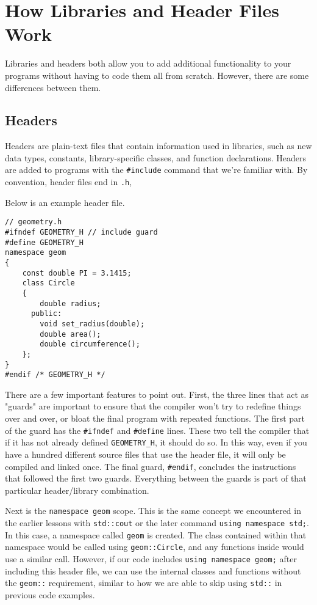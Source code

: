 \section{How Libraries and Header Files Work}
Libraries and headers both allow you to add additional functionality to your programs without having to code them all from scratch. However, there are some differences between them.

\subsection{Headers}
Headers are plain-text files that contain information used in libraries, such as new data types, constants, library-specific classes, and function declarations.  Headers are added to programs with the \texttt{\#include} command that we're familiar with.  By convention, header files end in \texttt{.h}, 

Below is an example header file.

\begin{verbatim}
// geometry.h
#ifndef GEOMETRY_H // include guard
#define GEOMETRY_H
namespace geom
{
    const double PI = 3.1415;
    class Circle 
    {
        double radius;
      public:
        void set_radius(double);
        double area();
        double circumference();
    };
}
#endif /* GEOMETRY_H */
\end{verbatim}

There are a few important features to point out.  First, the three lines that act as "guards" are important to ensure that the compiler won't try to redefine things over and over, or bloat the final program with repeated functions.  The first part of the guard has the \texttt{\#ifndef} and \texttt{\#define} lines.  These two tell the compiler that if it has not already defined \texttt{GEOMETRY\_H}, it should do so.  In this way, even if you have a hundred different source files that use the header file, it will only be compiled and linked once.  The final guard, \texttt{\#endif}, concludes the instructions that followed the first two guards.  Everything between the guards is part of that particular header/library combination.

Next is the \texttt{namespace geom} scope.  
This is the same concept we encountered in the earlier lessons with \texttt{std::cout} or the later command \texttt{using namespace std;}.  
In this case, a namespace called \texttt{geom} is created.  
The class contained within that namespace would be called using \texttt{geom::Circle}, and any functions inside would use a similar call.  
However, if our code includes \texttt{using namespace geom;} after including this header file, we can use the internal classes and functions without the \texttt{geom::} requirement, similar to how we are able to skip using \texttt{std::} in previous code examples.

